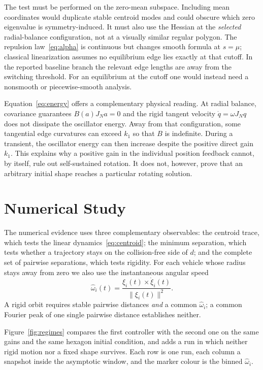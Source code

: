 \documentclass[conference]{IEEEtran}
\newcommand{\norm}[1]{\lVert#1\rVert}
\begin{document}
The test must be performed on the zero-mean subspace. Including mean coordinates would duplicate stable centroid modes and could obscure which zero eigenvalue is symmetry-induced. It must also use the Hessian at the \emph{selected} radial-balance configuration, not at a visually similar regular polygon. The repulsion law~\eqref{eq:alpha} is continuous but changes smooth formula at $s=\mu$; classical linearization assumes no equilibrium edge lies exactly at that cutoff. In the reported baseline branch the relevant edge lengths are away from the switching threshold. For an equilibrium at the cutoff one would instead need a nonsmooth or piecewise-smooth analysis.

Equation~\eqref{eq:energy} offers a complementary physical reading. At radial balance, covariance guarantees $B(a)J_Na=0$ and the rigid tangent velocity $\dot q=\omega J_Nq$ does not dissipate the oscillator energy. Away from that configuration, some tangential edge curvatures can exceed $k_1$ so that $B$ is indefinite. During a transient, the oscillator energy can then increase despite the positive direct gain $k_1$. This explains why a positive gain in the individual position feedback cannot, by itself, rule out self-sustained rotation. It does not, however, prove that an arbitrary initial shape reaches a particular rotating solution.

\section{Numerical Study}
\label{sec:sim}
The numerical evidence uses three complementary observables: the centroid trace, which tests the linear dynamics~\eqref{eq:centroid}; the minimum separation, which tests whether a trajectory stays on the collision-free side of $d$; and the complete set of pairwise separations, which tests rigidity. For each vehicle whose radius stays away from zero we also use the instantaneous angular speed
\begin{equation}
 \widehat\omega_i(t)=\frac{\xi_i(t)\times\dot\xi_i(t)}{\norm{\xi_i(t)}^2}.
 \label{eq:diagnostic}
\end{equation}
A rigid orbit requires stable pairwise distances \emph{and} a common $\widehat\omega_i$; a common Fourier peak of one single pairwise distance establishes neither.

Figure~\ref{fig:regimes} compares the first controller with the second one on the same gains and the same hexagon initial condition, and adds a run in which neither rigid motion nor a fixed shape survives. Each row is one run, each column a snapshot inside the asymptotic window, and the marker colour is the binned $\widehat\omega_i$.
\end{document}
